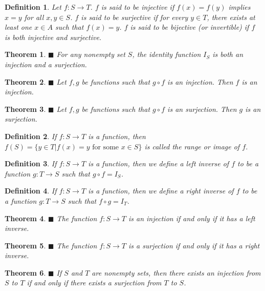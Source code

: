 \documentclass[a4paper]{article}
\newtheorem{mytheorem}{Theorem}
\newtheorem{mydef}{Definition}
\numberwithin{mytheorem}{section}
\numberwithin{mydef}{section}
\numberwithin{axiom}{section}
\numberwithin{example}{section}
\newcommand{\done}{$\blacksquare$ }
\begin{document}
\begin{mydef} Let $f: S \rightarrow T$. $f$ is said to be injective if $f(x) = f(y)$ implies $x=y$ for all $x,y \in S$. $f$ is said to be surjective if for every $y \in T$, there exists at least one $x \in A$ such that $f(x) = y$. $f$ is said to be bijective (or invertible) if $f$ is both injective and surjective.
\end{mydef}

\begin{mytheorem} \done For any nonempty set $S$, the identity function $I_{S}$ is both an injection and a surjection.
\end{mytheorem}

\begin{mytheorem} \done Let $f,g$ be functions such that $g \circ f$ is an injection. Then $f$ is an injection.
\end{mytheorem}

\begin{mytheorem} \done Let $f,g$ be functions such that $g \circ f$ is an surjection. Then $g$ is an surjection.
\end{mytheorem}

\begin{mydef} If $f: S \rightarrow T$ is a function, then $f(S) = \{ y \in T | f(x) = y \text { for some } x \in S \} $ is called the range or image of $f$.
\end{mydef}

\begin{mydef} If $f: S \rightarrow T$ is a function, then we define a left inverse of $f$ to be a function $g: T \rightarrow S$ such that $g \circ f = I_{S}$. 
\end{mydef}

\begin{mydef} If $f: S \rightarrow T$ is a function, then we define a right inverse of $f$ to be a function $g: T \rightarrow S$ such that $f \circ g = I_{T}$. 
\end{mydef}

\begin{mytheorem} \done The function $f: S \rightarrow T$ is an injection if and only if it has a left inverse.
\end{mytheorem}

\begin{mytheorem} \done The function $f: S \rightarrow T$ is a surjection if and only if it has a right inverse.
\end{mytheorem}

\begin{mytheorem} \done If $S$ and $T$ are nonempty sets, then there exists an injection from $S$ to $T$ if and only if there exists a surjection from $T$ to $S$.
\end{mytheorem}
\end{document}
